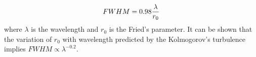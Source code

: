 


\begin{equation} 
FWHM = 0.98 {\lambda \over r_0} 
\end{equation} 
where $\lambda$ is the wavelength and $r_0$ is the Fried's
parameter. It can be shown that the variation of $r_0$ with wavelength
predicted by the Kolmogorov's turbulence implies $FWHM \propto \lambda^{-0.2}$. 	




